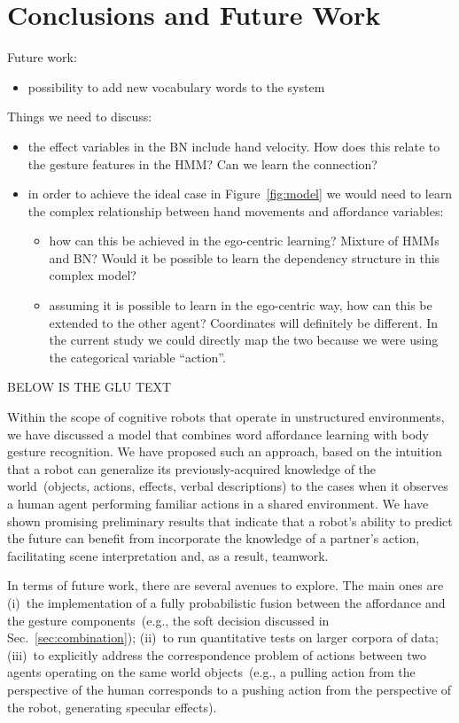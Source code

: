 
\section{Conclusions and Future Work}

Future work:
\begin{itemize}
  \item possibility to add new vocabulary words to the system
\end{itemize}

Things we need to discuss:
\begin{itemize}
\item the effect variables in the BN include hand velocity. How does this relate to the gesture features in the HMM? Can we learn the connection?
\item in order to achieve the ideal case in Figure~\ref{fig:model} we would need to learn the complex relationship between hand movements and affordance variables:
  \begin{itemize}
  \item how can this be achieved in the ego-centric learning? Mixture of HMMs and BN? Would it be possible to learn the dependency structure in this complex model?
  \item assuming it is possible to learn in the ego-centric way, how can this be extended to the other agent? Coordinates will definitely be different. In the current study we could directly map the two because we were using the categorical variable ``action''.
  \end{itemize}
\end{itemize}

BELOW IS THE GLU TEXT

Within the scope of cognitive robots that operate in unstructured environments, we have discussed a model that combines word affordance learning with body gesture recognition. We have proposed such an approach, based on the intuition that a robot can generalize its previously-acquired knowledge of the world~(objects, actions, effects, verbal descriptions) to the cases when it observes a human agent performing familiar actions in a shared \hr{} environment. We have shown promising preliminary results that indicate that a robot's ability to predict the future can benefit from incorporate the knowledge of a partner's action, facilitating scene interpretation and, as a result, teamwork.

In terms of future work, there are several avenues to explore. The main ones are (i)~the implementation of a fully probabilistic fusion between the affordance and the gesture components~(e.g., the soft decision discussed in Sec.~\ref{sec:combination}); (ii)~to run quantitative tests on larger corpora of \hr{} data; (iii)~to explicitly address the correspondence problem of actions between two agents operating on the same world objects~(e.g., a pulling action from the perspective of the human corresponds to a pushing action from the perspective of the robot, generating specular effects).
